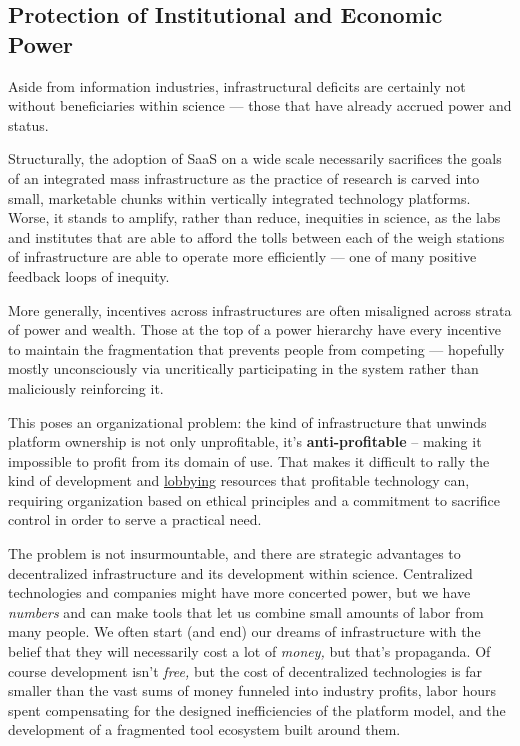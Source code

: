 \hypertarget{protection-of-institutional-and-economic-power}{%
\subsection{Protection of Institutional and Economic
Power}\label{protection-of-institutional-and-economic-power}}

Aside from information industries, infrastructural deficits are
certainly not without beneficiaries within science --- those that have
already accrued power and status.

Structurally, the adoption of SaaS on a wide scale necessarily
sacrifices the goals of an integrated mass infrastructure as the
practice of research is carved into small, marketable chunks within
vertically integrated technology platforms. Worse, it stands to amplify,
rather than reduce, inequities in science, as the labs and institutes
that are able to afford the tolls between each of the weigh stations of
infrastructure are able to operate more efficiently --- one of many
positive feedback loops of inequity.

More generally, incentives across infrastructures are often misaligned
across strata of power and wealth. Those at the top of a power hierarchy
have every incentive to maintain the fragmentation that prevents people
from competing --- hopefully mostly unconsciously via uncritically
participating in the system rather than maliciously reinforcing it.

This poses an organizational problem: the kind of infrastructure that
unwinds platform ownership is not only unprofitable, it's
\textbf{anti-profitable} -- making it impossible to profit from its
domain of use. That makes it difficult to rally the kind of development
and \href{https://www.snsi.info/}{lobbying} resources that profitable
technology can, requiring organization based on ethical principles and a
commitment to sacrifice control in order to serve a practical need.

The problem is not insurmountable, and there are strategic advantages to
decentralized infrastructure and its development within science.
Centralized technologies and companies might have more concerted power,
but we have \emph{numbers} and can make tools that let us combine small
amounts of labor from many people. We often start (and end) our dreams
of infrastructure with the belief that they will necessarily cost a lot
of \emph{money,} but that's propaganda. Of course development isn't
\emph{free,} but the cost of decentralized technologies is far smaller
than the vast sums of money funneled into industry profits, labor hours
spent compensating for the designed inefficiencies of the platform
model, and the development of a fragmented tool ecosystem built around
them.

